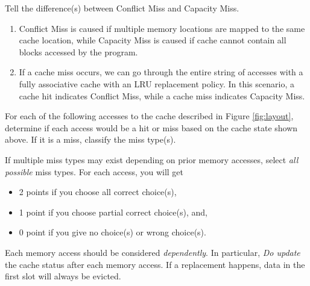 \begin{questions}
{}

\newpage

\question[3] Tell the difference(s) between Conflict Miss and
Capacity Miss.
{

    \begin{solution}
        \begin{enumerate}[$\bullet$]
            \item Conflict Miss is caused if multiple memory locations are mapped to the same cache location, while Capacity Miss is caused if cache cannot contain all blocks accessed by the program.
            \item If a cache miss occurs, we can go through the entire string of accesses with a fully associative cache with an LRU replacement policy. In this scenario, a cache hit indicates Conflict Miss, while a cache miss indicates Capacity Miss.
        \end{enumerate}
    \end{solution}

}


\question[12] For each of the following accesses to the cache
described in Figure \ref{fig:layout}, determine if each
access would be a hit or miss based on the cache state shown above.
If it is a miss, classify the miss type(s). \label{access_simulate}

If multiple miss types may exist depending on prior memory accesses,
select \emph{all possible} miss types. For each access, you will get
\begin{itemize}
    \item 2 points if you choose all correct choice(s),
    \item 1 point if you choose partial correct choice(s), and,
    \item 0 point if you give no choice(s) or wrong choice(s).
\end{itemize}

Each memory access should be considered \emph{dependently}.
In particular, \emph{Do update} the cache status after each memory
access. If a replacement happens, data in the first slot will 
always be evicted.



\end{questions}
